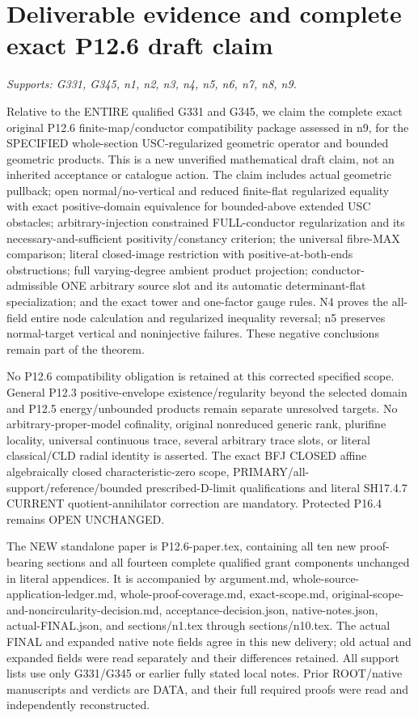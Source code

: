 \section{Deliverable evidence and complete exact P12.6 draft claim}
\textit{Supports: G331, G345, n1, n2, n3, n4, n5, n6, n7, n8, n9.}

Relative to the ENTIRE qualified G331 and G345, we claim the complete exact original P12.6 finite-map/conductor compatibility package assessed in n9, for the SPECIFIED whole-section USC-regularized geometric operator and bounded geometric products. This is a new unverified mathematical draft claim, not an inherited acceptance or catalogue action. The claim includes actual geometric pullback; open normal/no-vertical and reduced finite-flat regularized equality with exact positive-domain equivalence for bounded-above extended USC obstacles; arbitrary-injection constrained FULL-conductor regularization and its necessary-and-sufficient positivity/constancy criterion; the universal fibre-MAX comparison; literal closed-image restriction with positive-at-both-ends obstructions; full varying-degree ambient product projection; conductor-admissible ONE arbitrary source slot and its automatic determinant-flat specialization; and the exact tower and one-factor gauge rules. N4 proves the all-field entire node calculation and regularized inequality reversal; n5 preserves normal-target vertical and noninjective failures. These negative conclusions remain part of the theorem.

No P12.6 compatibility obligation is retained at this corrected specified scope. General P12.3 positive-envelope existence/regularity beyond the selected domain and P12.5 energy/unbounded products remain separate unresolved targets. No arbitrary-proper-model cofinality, original nonreduced generic rank, plurifine locality, universal continuous trace, several arbitrary trace slots, or literal classical/CLD radial identity is asserted. The exact BFJ CLOSED affine algebraically closed characteristic-zero scope, PRIMARY/all-support/reference/bounded prescribed-D-limit qualifications and literal SH17.4.7 CURRENT quotient-annihilator correction are mandatory. Protected P16.4 remains OPEN UNCHANGED.

The NEW standalone paper is P12.6-paper.tex, containing all ten new proof-bearing sections and all fourteen complete qualified grant components unchanged in literal appendices. It is accompanied by argument.md, whole-source-application-ledger.md, whole-proof-coverage.md, exact-scope.md, original-scope-and-noncircularity-decision.md, acceptance-decision.json, native-notes.json, actual-FINAL.json, and sections/n1.tex through sections/n10.tex. The actual FINAL and expanded native note fields agree in this new delivery; old actual and expanded fields were read separately and their differences retained. All support lists use only G331/G345 or earlier fully stated local notes. Prior ROOT/native manuscripts and verdicts are DATA, and their full required proofs were read and independently reconstructed.

